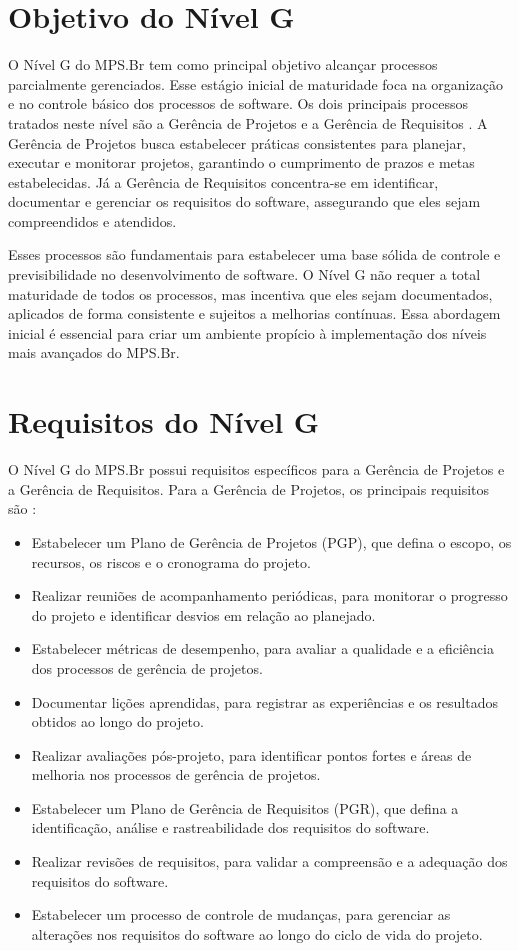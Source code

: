 \documentclass[
	12pt,				%
	oneside,			%
	a4paper,			%
	english,			%
	brazil				%
	]{abntex2unama}
\begin{document}
\chapter{Objetivo do Nível G}
O Nível G do MPS.Br tem como principal objetivo alcançar processos parcialmente gerenciados. Esse estágio inicial de maturidade foca na organização e no controle básico dos processos de software. Os dois principais processos tratados neste nível são a Gerência de Projetos e a Gerência de Requisitos \cite{mpsbr_levelG}. A Gerência de Projetos busca estabelecer práticas consistentes para planejar, executar e monitorar projetos, garantindo o cumprimento de prazos e metas estabelecidas. Já a Gerência de Requisitos concentra-se em identificar, documentar e gerenciar os requisitos do software, assegurando que eles sejam compreendidos e atendidos.

Esses processos são fundamentais para estabelecer uma base sólida de controle e previsibilidade no desenvolvimento de software. O Nível G não requer a total maturidade de todos os processos, mas incentiva que eles sejam documentados, aplicados de forma consistente e sujeitos a melhorias contínuas. Essa abordagem inicial é essencial para criar um ambiente propício à implementação dos níveis mais avançados do MPS.Br.

\chapter{Requisitos do Nível G}

O Nível G do MPS.Br possui requisitos específicos para a Gerência de Projetos e a Gerência de Requisitos. Para a Gerência de Projetos, os principais requisitos são \cite{mpsbr_requirements}:

\begin{itemize}
	\item Estabelecer um Plano de Gerência de Projetos (PGP), que defina o escopo, os recursos, os riscos e o cronograma do projeto.
	\item Realizar reuniões de acompanhamento periódicas, para monitorar o progresso do projeto e identificar desvios em relação ao planejado.
	\item Estabelecer métricas de desempenho, para avaliar a qualidade e a eficiência dos processos de gerência de projetos.
	\item Documentar lições aprendidas, para registrar as experiências e os resultados obtidos ao longo do projeto.
	\item Realizar avaliações pós-projeto, para identificar pontos fortes e áreas de melhoria nos processos de gerência de projetos.
	\item Estabelecer um Plano de Gerência de Requisitos (PGR), que defina a identificação, análise e rastreabilidade dos requisitos do software.
	\item Realizar revisões de requisitos, para validar a compreensão e a adequação dos requisitos do software.
	\item Estabelecer um processo de controle de mudanças, para gerenciar as alterações nos requisitos do software ao longo do ciclo de vida do projeto.
\end{itemize}
\end{document}
